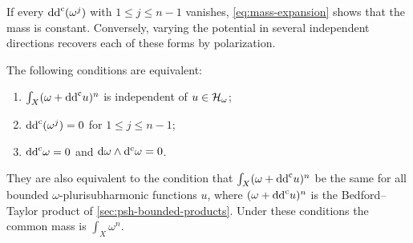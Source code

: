 If every $\mathrm{dd}^{\mathrm{c}}(\omega^j)$ with $1\leq j\leq n-1$ vanishes, \eqref{eq:mass-expansion} shows that the mass is constant. Conversely, varying the potential in several independent directions recovers each of these forms by polarization.

\begin{theorem}[Chiose]\label{thm:mass-invariance-characterization}
The following conditions are equivalent:
\begin{enumerate}
\item $\int_X(\omega+\mathrm{dd}^{\mathrm{c}} u)^n$ is independent of $u\in\mathcal H_\omega$;
\item $\mathrm{dd}^{\mathrm{c}}(\omega^j)=0$ for $1\leq j\leq n-1$;
\item $\mathrm{dd}^{\mathrm{c}}\omega=0$ and $\mathrm{d}\omega\wedge\mathrm d^{\mathrm c}\omega=0$.
\end{enumerate}
They are also equivalent to the condition that $\int_X(\omega+\mathrm{dd}^{\mathrm{c}} u)^n$ be the same for all bounded $\omega$-plurisubharmonic functions $u$, where $(\omega+\mathrm{dd}^{\mathrm{c}} u)^n$ is the Bedford--Taylor product of \cref{sec:psh-bounded-products}. Under these conditions the common mass is $\int_X\omega^n$.
\end{theorem}
